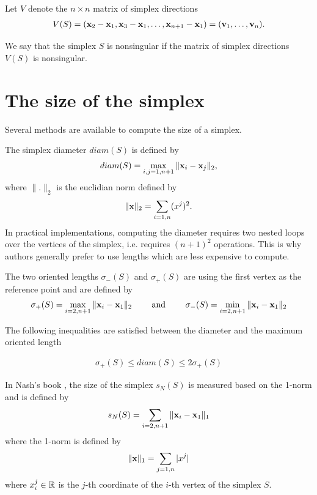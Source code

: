 Let $V$ denote the $n\times n$ matrix of simplex directions 
\begin{eqnarray}
\label{simplex-directions}
V(S) = (\mathbf{x}_2 - \mathbf{x}_1, \mathbf{x}_3 - \mathbf{x}_1 , \ldots , \mathbf{x}_{n+1} - \mathbf{x}_1) = (\mathbf{v}_1, \ldots , \mathbf{v}_n).
\end{eqnarray}

We say that the simplex $S$ is nonsingular if the matrix of simplex directions $V(S)$ is nonsingular.

\section{The size of the simplex}
\label{section-simplexsize}

Several methods are available to compute the size of a simplex.

The simplex diameter $diam(S)$ is defined by 
\begin{eqnarray}
\label{simplex-diameter}
diam(S) = \max_{i,j=1,n+1} \|\mathbf{x}_i - \mathbf{x}_j\|_2,
\end{eqnarray}
where $\|.\|_2$ is the euclidian norm defined by 
\begin{eqnarray}
\|\mathbf{x}\|_2 = \sum_{i=1,n}(x^j)^2.
\end{eqnarray}
In practical implementations, computing the diameter requires two nested loops over the 
vertices of the simplex, i.e. requires $(n+1)^2$ operations. This is why authors generally 
prefer to use lengths which are less expensive to compute.

The two oriented lengths $\sigma_-(S)$ and $\sigma_+(S)$ are using the 
first vertex as the reference point and are defined by 
\begin{eqnarray}
\label{simplex-sigma}
\sigma_+(S) = \max_{i=2,n+1} \|\mathbf{x}_i - \mathbf{x}_1\|_2 \qquad \textrm { and } \qquad \sigma_-(S) = \min_{i=2,n+1} \|\mathbf{x}_i - \mathbf{x}_1\|_2
\end{eqnarray}

The following inequalities are satisfied between the diameter and the maximum oriented length

\begin{eqnarray}
\label{simplex-sigma-diam}
\sigma_+(S) \leq diam(S) \leq 2 \sigma_+(S)
\end{eqnarray}

In Nash's book \cite{nla.cat-vn1060620}, the size of the simplex $s_N(S)$ is measured
based on the 1-norm and is defined by 
\begin{eqnarray}
\label{simplex-sizenash}
s_N(S) = \sum_{i=2,n+1} \|\mathbf{x}_i - \mathbf{x}_1\|_1
\end{eqnarray}
where the 1-norm is defined by 
\begin{eqnarray}
\label{simplex-sizenash2}
\|\mathbf{x} \|_1 = \sum_{j=1,n} |x^j|
\end{eqnarray}
where $x_i^j\in\mathbb{R}$ is the $j$-th coordinate of the $i$-th vertex of the simplex $S$.

